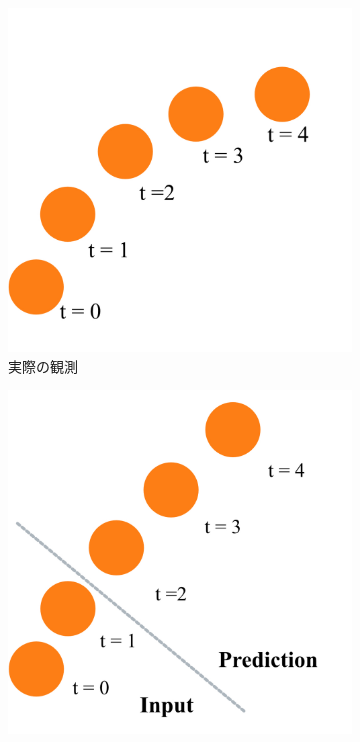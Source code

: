       \begin{figure}[htbp]
        \begin{subfigure}[b]{0.3\textwidth}
          \centering
          \includegraphics[width=\textwidth]{figures/exp1/pred_sample_gt.jpg}
          \caption{実際の観測}
          \label{fig:pred_sample_gt}
        \end{subfigure}
        \begin{subfigure}[b]{0.3\textwidth}
          \centering
          \includegraphics[width=\textwidth]{figures/exp1/pred_sample_determin.jpg}

\end{subfigure}
\end{figure}
